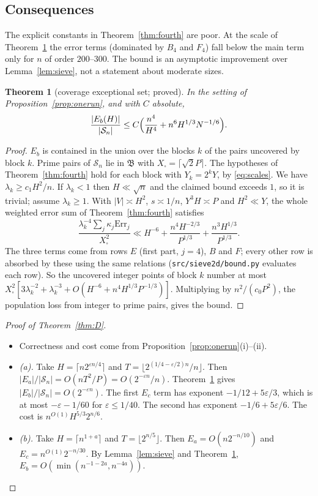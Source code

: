 \documentclass[11pt]{amsart}
\newtheorem{theorem}{Theorem}[section]
\theoremstyle{definition}
\newcommand{\Sn}{\mathcal{S}_n}
\newcommand{\Xb}{X_{\square}}
\begin{document}
\subsection{Consequences}
The explicit constants in Theorem~\ref{thm:fourth} are poor. At the scale of
Theorem~\ref{thm:Eb4} the error terms (dominated by $B_4$ and $F_4$) fall below the main term
only for $n$ of order $200$--$300$. The bound is an asymptotic improvement over
Lemma~\ref{lem:sieve}, not a statement about moderate sizes.

\begin{theorem}[coverage exceptional set; proved]\label{thm:Eb4}
In the setting of Proposition~\ref{prop:onerun}, and with $C$ absolute,
\[
  \frac{|E_b(H)|}{|\Sn|}\le C\Bigl(\frac{n^4}{H^4}+n^6H^{1/3}N^{-1/6}\Bigr).
\]
\end{theorem}
\begin{proof}
$E_b$ is contained in the union over the blocks $k$ of the pairs uncovered by block $k$. Prime
pairs of $\Sn$ lie in $\mathfrak B$ with $\Xb=\lceil\sqrt2P\rceil$. The hypotheses of
Theorem~\ref{thm:fourth} hold for each block with $Y_k=2^kY$, by \eqref{eq:scales}. We have
$\lambda_k\ge c_1H^2/n$. If $\lambda_k<1$ then $H\ll\sqrt n$ and the claimed bound exceeds $1$,
so it is trivial; assume $\lambda_k\ge1$. With $|V|\asymp H^2$, $s\asymp1/n$, $Y^3H\asymp P$ and
$H^2\ll Y$, the whole weighted error sum of Theorem~\ref{thm:fourth} satisfies
\[
  \frac{\lambda_k^{-4}\sum_j\kappa_j\mathrm{Err}_j}{\Xb^2}\ll H^{-6}+\frac{n^4H^{-2/3}}{P^{1/3}}
  +\frac{n^3H^{1/3}}{P^{1/3}}.
\]
The three terms come from rows $E$ (first part, $j=4$), $B$ and $F$; every other row is absorbed
by these using the same relations (\texttt{src/sieve2d/bound.py} evaluates each row). So the
uncovered integer points of block $k$ number at most
$\Xb^2[3\lambda_k^{-2}+\lambda_k^{-3}+O(H^{-6}+n^4H^{1/3}P^{-1/3})]$. Multiplying by
$n^2/(c_0P^2)$, the population loss from integer to prime pairs, gives the bound.
\end{proof}

\begin{proof}[Proof of Theorem~\ref{thm:D}]
\begin{itemize}
\item Correctness and cost come from Proposition~\ref{prop:onerun}(i)--(ii).
\item \emph{(a).} Take $H=\lceil n2^{\varepsilon n/4}\rceil$ and
  $T=\lfloor2^{(1/4-\varepsilon/2)n}/n\rfloor$. Then $|E_a|/|\Sn|=O(nT^2/P)=O(2^{-\varepsilon n}/n)$.
  Theorem~\ref{thm:Eb4} gives $|E_b|/|\Sn|=O(2^{-\varepsilon n})$. The first $E_c$ term has
  exponent $-1/12+5\varepsilon/3$, which is at most $-\varepsilon-1/60$ for $\varepsilon\le1/40$.
  The second has exponent $-1/6+5\varepsilon/6$. The cost is $n^{O(1)}H^{5/3}2^{n/6}$.
\item \emph{(b).} Take $H=\lceil n^{1+a}\rceil$ and $T=\lfloor2^{n/5}\rfloor$. Then
  $E_a=O(n2^{-n/10})$ and $E_c=n^{O(1)}2^{-n/30}$. By Lemma~\ref{lem:sieve} and
  Theorem~\ref{thm:Eb4}, $E_b=O(\min(n^{-1-2a},n^{-4a}))$.
\end{itemize}
\end{proof}
\end{document}
